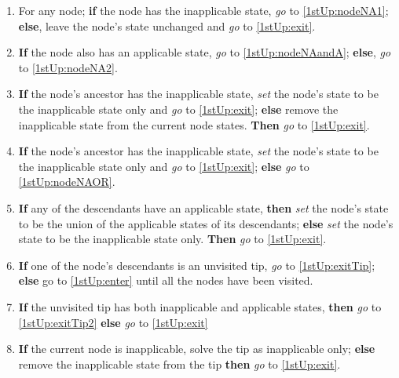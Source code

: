 \documentclass[a4paper,12pt]{article}
\begin{document}
\begin{enumerate}
    \item \label{1stUp:enter} For any node; \textbf{if} the node has the inapplicable state, \textit{go} to \ref{1stUp:nodeNA1}; \textbf{else}, leave the node's state unchanged and \textit{go} to \ref{1stUp:exit}.
    \item \label{1stUp:nodeNA1} \textbf{If} the node also has an applicable state, \textit{go} to \ref{1stUp:nodeNAandA}; \textbf{else}, \textit{go} to \ref{1stUp:nodeNA2}.
    \item \label{1stUp:nodeNAandA} \textbf{If} the node's ancestor has the inapplicable state, \textit{set} the node's state to be the inapplicable state only and \textit{go} to \ref{1stUp:exit}; \textbf{else} remove the inapplicable state from the current node states. \textbf{Then} \textit{go} to \ref{1stUp:exit}.
    \item \label{1stUp:nodeNA2} \textbf{If} the node's ancestor has the inapplicable state, \textit{set} the node's state to be the inapplicable state only and \textit{go} to \ref{1stUp:exit}; \textbf{else} \textit{go} to \ref{1stUp:nodeNAOR}.
    \item \label{1stUp:nodeNAOR} \textbf{If} any of the descendants have an applicable state, \textbf{then} \textit{set} the node's state to be the union of the applicable states of its descendants; \textbf{else} \textit{set} the node's state to be the inapplicable state only. \textbf{Then} \textit{go} to \ref{1stUp:exit}.
    \item \label{1stUp:exit} \textbf{If} one of the node's descendants is an unvisited tip, \textit{go} to \ref{1stUp:exitTip}; \textbf{else} go to \ref{1stUp:enter} until all the nodes have been visited. %
    \item \label{1stUp:exitTip} \textbf{If} the unvisited tip has both inapplicable and applicable states, \textbf{then} \textit{go} to \ref{1stUp:exitTip2} \textbf{else} \textit{go} to \ref{1stUp:exit}
    \item \label{1stUp:exitTip2} \textbf{If} the current node is inapplicable, solve the tip as inapplicable only; \textbf{else} remove the inapplicable state from the tip \textbf{then} \textit{go} to \ref{1stUp:exit}.
\end{enumerate}
\end{document}
